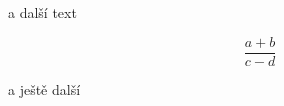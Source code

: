 \documentclass{article}
\begin{document}
% 
% 
 a další text

\[\frac{a+b}{c-d}\]

a ještě další
\end{document}
